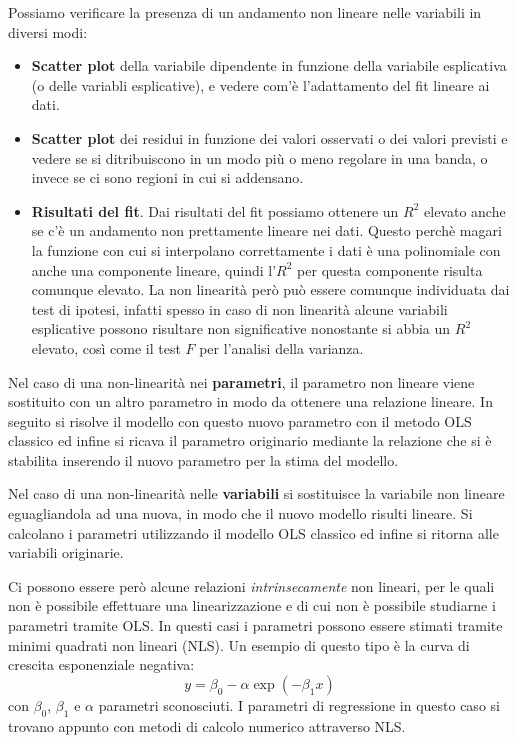 Possiamo verificare la presenza di un andamento non lineare nelle variabili in diversi modi:
\begin{itemize}
	\item \textbf{Scatter plot} della variabile dipendente in funzione della variabile esplicativa (o delle variabli esplicative), e vedere com'è l'adattamento del fit lineare ai dati.
	\item \textbf{Scatter plot} dei residui in funzione dei valori osservati o dei valori previsti e vedere se si ditribuiscono in un modo più o meno regolare in una banda, o invece se ci sono regioni in cui si addensano.
	\item \textbf{Risultati del fit}. Dai risultati del fit possiamo ottenere un $R^2$ elevato anche se c'è un andamento non prettamente lineare nei dati. Questo perchè magari la funzione con cui si interpolano correttamente i dati è una polinomiale con anche una componente lineare, quindi l'$R^2$ per questa componente risulta comunque elevato. La non linearità però può essere comunque individuata dai test di ipotesi, infatti spesso in caso di non linearità alcune variabili esplicative possono risultare non significative nonostante si abbia un $R^2$ elevato, così come il test $F$ per l'analisi della varianza. 
\end{itemize}

Nel caso di una non-linearità nei \textbf{parametri}, il parametro non lineare viene sostituito con un altro parametro in modo da ottenere una relazione lineare. In seguito si risolve il modello con questo nuovo parametro con il metodo OLS classico ed infine si ricava il parametro originario mediante la relazione che si è stabilita inserendo il nuovo parametro per la stima del modello.

Nel caso di una non-linearità nelle \textbf{variabili} si sostituisce la variabile non lineare eguagliandola ad una nuova, in modo che il nuovo modello risulti lineare. Si calcolano i parametri utilizzando il modello OLS classico ed infine si ritorna alle variabili originarie.

Ci possono essere però alcune relazioni \textit{intrinsecamente} non lineari, per le quali non è possibile effettuare una linearizzazione e di cui non è possibile studiarne i parametri tramite OLS. In questi casi i parametri possono essere stimati tramite minimi quadrati non lineari (NLS). Un esempio di questo tipo è la curva di crescita esponenziale negativa:
\begin{equation}
	y = \beta_0 - \alpha \exp(-\beta_1 x)
\end{equation}
con $\beta_0$, $\beta_1$ e $\alpha$ parametri sconosciuti. I parametri di regressione in questo caso si trovano appunto con metodi di calcolo numerico attraverso NLS.


